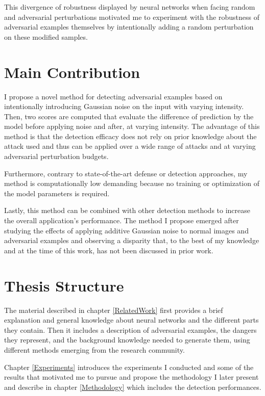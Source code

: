 This divergence of robustness displayed by neural networks when facing random
and adversarial perturbations motivated me to experiment with the robustness of
adversarial examples themselves by intentionally adding a random perturbation on
these modified samples.

\clearpage
\section{Main Contribution}
I propose a novel method for detecting adversarial examples based on
intentionally introducing Gaussian noise on the input with varying intensity.
Then, two scores are computed that evaluate the difference of prediction by the
model before applying noise and after, at varying intensity. The advantage of
this method is that the detection efficacy does not rely on prior knowledge
about the attack used and thus can be applied over a wide range of attacks and
at varying adversarial perturbation budgets.

Furthermore, contrary to state-of-the-art defense or detection approaches, my
method is computationally low demanding because no training or optimization of
the model parameters is required.

Lastly, this method can be combined with other detection methods to increase the
overall application's performance. The method I propose emerged after studying
the effects of applying additive Gaussian noise to normal images and adversarial
examples and observing a disparity that, to the best of my knowledge and at the
time of this work, has not been discussed in prior work.

\section{Thesis Structure}
The material described in chapter \ref{RelatedWork} first provides a brief
explanation and general knowledge about neural networks and the different parts
they contain. Then it includes a description of adversarial examples, the
dangers they represent, and the background knowledge needed to generate them,
using different methods emerging from the research community.

Chapter \ref{Experiments} introduces the experiments I conducted and some of the
results that motivated me to pursue and propose the methodology I later present
and describe in chapter \ref{Methodology} which includes the detection
performances.

